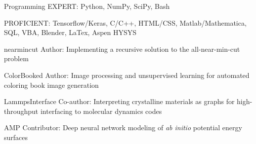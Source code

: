 

\begin{cvskillsnoncentered}

  \cvskill
    {Programming} %
    {EXPERT: Python, NumPy, SciPy, Bash}
    
    
  \cvskill
    {}
    {PROFICIENT: Tensorflow/Keras, C/C++, HTML/CSS, Matlab/Mathematica, SQL, VBA, Blender, LaTex, Aspen HYSYS} %

  \cvskill
    {nearmincut} %
    {Author: Implementing a recursive solution to the all-near-min-cut problem } 

  \cvskill
    {ColorBooked} %
    {Author: Image processing and unsupervised learning for automated coloring book image generation}

  \cvskill
    {LammpsInterface} %
    {Co-author: Interpreting crystalline materials as graphs for high-throughput interfacing to molecular dynamics codes}
    
  \cvskill
    {AMP} %
    {Contributor: Deep neural network modeling of \textit{ab initio} potential energy surfaces} 
    

\end{cvskillsnoncentered}
